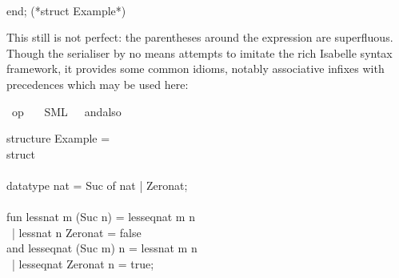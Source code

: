 \begin{isabellebody}
\begin{isamarkuptext}
\hspace*{0pt}\\
\hspace*{0pt}end; (*struct Example*)%
\end{isamarkuptext}%
\isamarkuptrue%
%
\endisatagquote
{\isafoldquote}%
%
\isadelimquote
%
\endisadelimquote
%
\begin{isamarkuptext}%
\noindent This still is not perfect: the parentheses
  around the  expression are superfluous.
  Though the serialiser
  by no means attempts to imitate the rich Isabelle syntax
  framework, it provides some common idioms, notably
  associative infixes with precedences which may be used here:%
\end{isamarkuptext}%
\isamarkuptrue%
%
\isadelimquotett
%
\endisadelimquotett
%
\isatagquotett
{}\isamarkupfalse%
\ {\isachardoublequoteopen}op\ {\isasymand}{\isachardoublequoteclose}\isanewline
\ \ {\isacharparenleft}SML\ \ {}\ {\isachardoublequoteopen}andalso{\isachardoublequoteclose}{\isacharparenright}%
\endisatagquotett
{\isafoldquotett}%
%
\isadelimquotett
%
\endisadelimquotett
%
\isadelimquote
%
\endisadelimquote
%
\isatagquote
%
\begin{isamarkuptext}%
\isatypewriter%
\noindent%
\hspace*{0pt}structure Example = \\
\hspace*{0pt}struct\\
\hspace*{0pt}\\
\hspace*{0pt}datatype nat = Suc of nat | Zero{}nat;\\
\hspace*{0pt}\\
\hspace*{0pt}fun less{}nat m (Suc n) = less{}eq{}nat m n\\
\hspace*{0pt} ~| less{}nat n Zero{}nat = false\\
\hspace*{0pt}and less{}eq{}nat (Suc m) n = less{}nat m n\\
\hspace*{0pt} ~| less{}eq{}nat Zero{}nat n = true;\\
\hspace*{0pt}\\

\end{isamarkuptext}
\end{isabellebody}
